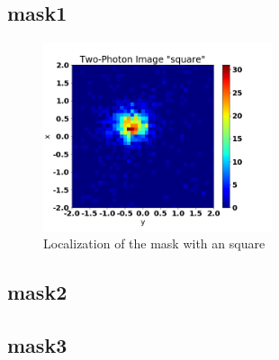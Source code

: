 \subsection{mask1}
\begin{figure}[h!]
\centering
\includegraphics[width=0.6\textwidth]{Figures/two-photonImageSq.png} 
\caption{Localization of the mask with an square}
\label{fig:localizationSq}
\end{figure}

\subsection{mask2}
\subsection{mask3}
